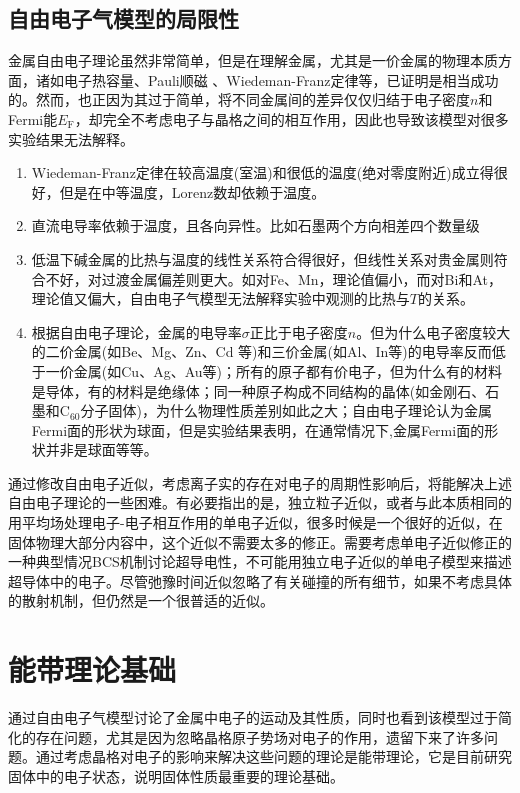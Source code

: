 \subsection{自由电子气模型的局限性}
金属自由电子理论虽然非常简单，但是在理解金属，尤其是一价金属的物理本质方面，诸如电子热容量、Pauli顺磁%
、Wiedeman-Franz定律等，已证明是相当成功的。然而，也正因为其过于简单，将不同金属间的差异仅仅归结于电子密度$n$和Fermi能$E_{\mathrm{F}}$，却完全不考虑电子与晶格之间的相互作用，因此也导致该模型对很多实验结果无法解释。
\begin{enumerate}
	\item Wiedeman-Franz定律在较高温度(室温)和很低的温度(绝对零度附近)成立得很好，但是在中等温度，Lorenz数却依赖于温度。
	\item 直流电导率依赖于温度，且各向异性。比如石墨两个方向相差四个数量级
	\item 低温下碱金属的比热与温度的线性关系符合得很好，但线性关系对贵金属则符合不好，对过渡金属偏差则更大。如对Fe、Mn，理论值偏小，而对Bi和At，理论值又偏大，自由电子气模型无法解释实验中观测的比热与$T$的关系。

	\item 根据自由电子理论，金属的电导率$\sigma$正比于电子密度$n$。但为什么电子密度较大的二价金属(如Be、Mg、Zn、Cd 等)和三价金属(如Al、In等)的电导率反而低于一价金属(如Cu、Ag、Au等)；所有的原子都有价电子，但为什么有的材料是导体，有的材料是绝缘体；同一种原子构成不同结构的晶体(如金刚石、石墨和$\mathrm{C}_{60}$分子固体)，为什么物理性质差别如此之大；自由电子理论认为金属Fermi面的形状为球面，但是实验结果表明，在通常情况下,金属Fermi面的形状并非是球面等等。
\end{enumerate}

通过修改自由电子近似，考虑离子实的存在对电子的周期性影响后，将能解决上述自由电子理论的一些困难。有必要指出的是，独立粒子近似，或者与此本质相同的用平均场处理电子-电子相互作用的单电子近似，很多时候是一个很好的近似，在固体物理大部分内容中，这个近似不需要太多的修正。需要考虑单电子近似修正的一种典型情况BCS机制讨论超导电性，不可能用独立电子近似的单电子模型来描述超导体中的电子。尽管弛豫时间近似忽略了有关碰撞的所有细节，如果不考虑具体的散射机制，但仍然是一个很普适的近似。

\section{能带理论基础} 
通过自由电子气模型讨论了金属中电子的运动及其性质，同时也看到该模型过于简化的存在问题，尤其是因为忽略晶格原子势场对电子的作用，遗留下来了许多问题。通过考虑晶格对电子的影响来解决这些问题的理论是能带理论，它是目前研究固体中的电子状态，说明固体性质最重要的理论基础。 
